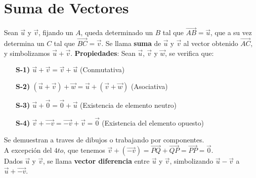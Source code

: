 \documentclass[11pt,a4paper]{article}
\begin{document}
\section{Suma de Vectores}
\noindent Sean $\overrightarrow{u}$ y $\overrightarrow{v}$, fijando un $A$, queda determinado un $B$ tal que $\overrightarrow{AB} = \overrightarrow{u}$, que a su vez determina un $C$ tal que $\overrightarrow{BC} = \overrightarrow{v}$. Se llama \textbf{suma} de $\overrightarrow{u}$ y $\overrightarrow{v}$ al vector obtenido $\overrightarrow{AC}$, y simbolizamos $\overrightarrow{u} + \overrightarrow{v}$.
\textbf{Propiedades}: Sean $\overrightarrow{u}$, $\overrightarrow{v}$ y $\overrightarrow{w}$, se verifica que:
\begin{itemize}
\item[\textbf{S-1)}] $\overrightarrow{u} + \overrightarrow{v} = \overrightarrow{v} + \overrightarrow{u}$ (Conmutativa)
\item[\textbf{S-2)}] $(\overrightarrow{u} + \overrightarrow{v})+\overrightarrow{w} = \overrightarrow{u} + (\overrightarrow{v}+\overrightarrow{w})$ (Asociativa)
\item[\textbf{S-3)}] $\overrightarrow{u} + \overrightarrow{0} = \overrightarrow{0} + \overrightarrow{u}$ (Existencia de elemento neutro)
\item[\textbf{S-4)}] $\overrightarrow{v} + \overrightarrow{-v} = \overrightarrow{-v} + \overrightarrow{v} = \overrightarrow{0}$ (Existencia del elemento opuesto)
\end{itemize}
Se demuestran a traves de dibujos o trabajando por componentes.\\ A excepci\'on del $4to$, que tenemos $\overrightarrow{v} + (\overrightarrow{-v}) = \overrightarrow{PQ} + \overrightarrow{QP} = \overrightarrow{PP} = \overrightarrow{0}$.\\
Dados $\overrightarrow{u}$ y $\overrightarrow{v}$, se llama \textbf{vector diferencia} entre $\overrightarrow{u}$ y $\overrightarrow{v}$, simbolizando $\overrightarrow{u} -\overrightarrow{v}$ a $\overrightarrow{u} + \overrightarrow{-v}$. 
\end{document}
